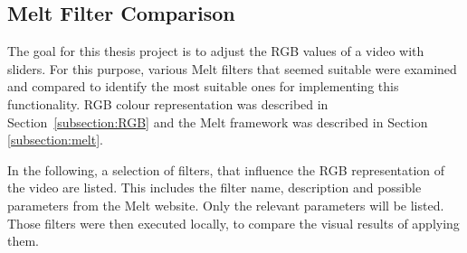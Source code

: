 \documentclass[../MasterThesis.tex]{subfiles}
\begin{document}
\newpage
\subsection{Melt Filter Comparison} \label{subsection:meltfilter}



The goal for this thesis project is to adjust the RGB values of a video with sliders. For this purpose, various Melt filters that seemed suitable were examined and compared to identify the most suitable ones for implementing this functionality. RGB colour representation was described in Section~\ref{subsection:RGB} and the Melt framework was described in Section \ref{subsection:melt}.

In the following, a selection of filters, that influence the RGB representation of the video are listed. This includes the filter name, description and possible parameters from the Melt website.\cite{melt_filters} Only the relevant parameters will be listed.
Those filters were then executed locally, to compare the visual results of applying them.
\end{document}
